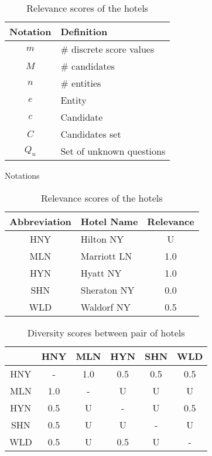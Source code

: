 \begin{table}[h!]
\centering
\begin{minipage}{0.45\textwidth}
\centering
\begin{tabular}{|c|l|}
\hline
\textbf{Notation} & \textbf{Definition} \\ \hline
$m$ & \# discrete score values \\ \hline
$M$ & \# candidates \\ \hline
$n$ & \# entities \\ \hline
$e$ & Entity \\ \hline
$c$ & Candidate \\ \hline
$C$ & Candidates set \\ \hline
$Q_u$ & Set of unknown questions \\ \hline
\end{tabular}
\caption{\small Notations}
\end{minipage}%
\hspace{1cm}  %
\begin{minipage}{0.45\textwidth}
\centering
\begin{tabular}{|c|l|c|}
\hline
\textbf{Abbreviation} & \textbf{Hotel Name} & \textbf{Relevance} \\ \hline
HNY & Hilton NY      & U \\ \hline
MLN & Marriott LN    & 1.0 \\ \hline
HYN & Hyatt NY       & 1.0 \\ \hline
SHN & Sheraton NY    & 0.0 \\ \hline
WLD & Waldorf NY     & 0.5 \\ \hline
\end{tabular}
\caption{\small Relevance scores of the hotels}
\label{tab:ny_hotels_relevance}
\end{minipage}
\end{table}






\begin{table}[h!]
\centering
\begin{tabular}{|c|c|c|c|c|c|}
\hline
       & HNY  & MLN  & HYN  & SHN  & WLD  \\ \hline
HNY    & -   & 1.0  & 0.5    & 0.5  & 0.5  \\ \hline
MLN    & 1.0  & -    & U    & U  & U  \\ \hline
HYN    & 0.5    & U    & -    & U  & 0.5    \\ \hline
SHN    & 0.5  & U  & U  & -    & U  \\ \hline
WLD    & 0.5  & U  & 0.5   & U  & -    \\ \hline
\end{tabular}
\caption{\small Diversity scores between pair of hotels}
\label{tab:ny_hotels_diversity}
\end{table}


